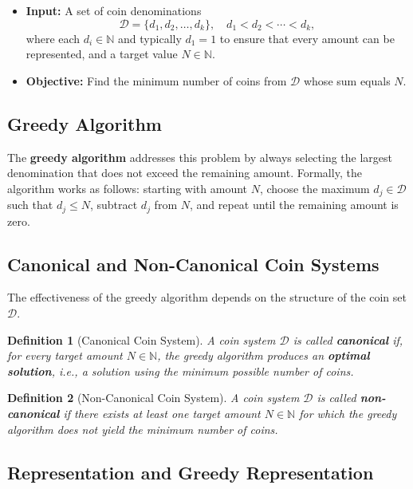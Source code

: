 \documentclass[12pt,a4paper]{report}
\newtheorem{definition}{Definition}
\begin{document}
\begin{itemize}
    \item \textbf{Input:} A set of coin denominations
    \[
    \mathcal{D} = \{d_1, d_2, \dots, d_k\}, \quad d_1 < d_2 < \cdots < d_k,
    \]
    where each $d_i \in \mathbb{N}$ and typically $d_1 = 1$ to ensure that every amount can be represented, and a target value $N \in \mathbb{N}$.
    \item \textbf{Objective:} Find the minimum number of coins from $\mathcal{D}$ whose sum equals $N$.
\end{itemize}

\subsection{Greedy Algorithm}

The \textbf{greedy algorithm} addresses this problem by always selecting the largest denomination that does not exceed the remaining amount. Formally, the algorithm works as follows: starting with amount $N$, choose the maximum $d_j \in \mathcal{D}$ such that $d_j \leq N$, subtract $d_j$ from $N$, and repeat until the remaining amount is zero.

\subsection{Canonical and Non-Canonical Coin Systems}

The effectiveness of the greedy algorithm depends on the structure of the coin set $\mathcal{D}$.\cite{cai2008}

\begin{definition}[Canonical Coin System]
A coin system $\mathcal{D}$ is called \textbf{canonical} if, for every target amount $N \in \mathbb{N}$, the greedy algorithm produces an \textbf{optimal solution}, i.e., a solution using the minimum possible number of coins.
\end{definition}

\begin{definition}[Non-Canonical Coin System]
A coin system $\mathcal{D}$ is called \textbf{non-canonical} if there exists at least one target amount $N \in \mathbb{N}$ for which the greedy algorithm does not yield the minimum number of coins.
\end{definition}

\subsection{Representation and Greedy Representation}
\end{document}
